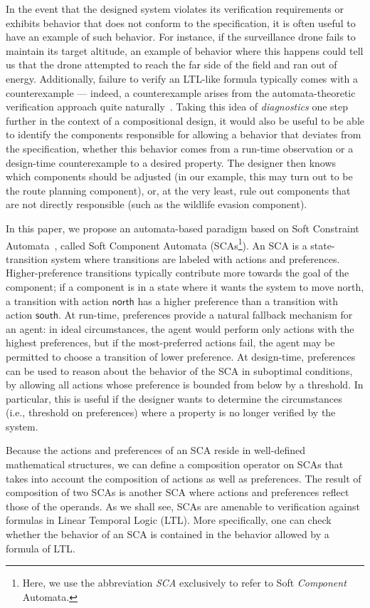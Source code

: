 \documentclass[a4paper]{article}
\theoremstyle{definition}
\newcommand{\north}{\mathsf{north}}
\newcommand{\south}{\mathsf{south}}
\begin{document}
In the event that the designed system violates its verification requirements or exhibits behavior that does not conform to the specification, it is often useful to have an example of such behavior. For instance, if the surveillance drone fails to maintain its target altitude, an example of behavior where this happens could tell us that the drone attempted to reach the far side of the field and ran out of energy. Additionally, failure to verify an LTL-like formula typically comes with a counterexample --- indeed, a counterexample arises from the automata-theoretic verification approach quite naturally~\cite{vardi-1995}. Taking this idea of \emph{diagnostics} one step further in the context of a compositional design, it would also be useful to be able to identify the components responsible for allowing a behavior that deviates from the specification, whether this behavior comes from a run-time observation or a design-time counterexample to a desired property. The designer then knows which components should be adjusted (in our example, this may turn out to be the route planning component), or, at the very least, rule out components that are not directly responsible (such as the wildlife evasion component).

In this paper, we propose an automata-based paradigm based on Soft Constraint Automata~\cite{arbab-santini-2013,kappe-arbab-talcott-2016}, called Soft Component Automata (SCAs\footnote{Here, we use the abbreviation \emph{SCA} exclusively to refer to Soft \emph{Component} Automata.}). An SCA is a state-transition system where transitions are labeled with actions and preferences. Higher-preference transitions typically contribute more towards the goal of the component; if a component is in a state where it wants the system to move north, a transition with action $\north$ has a higher preference than a transition with action $\south$. At run-time, preferences provide a natural fallback mechanism for an agent: in ideal circumstances, the agent would perform only actions with the highest preferences, but if the most-preferred actions fail, the agent may be permitted to choose a transition of lower preference. At design-time, preferences can be used to reason about the behavior of the SCA in suboptimal conditions, by allowing all actions whose preference is bounded from below by a threshold. In particular, this is useful if the designer wants to determine the circumstances (i.e., threshold on preferences) where a property is no longer verified by the system.

Because the actions and preferences of an SCA reside in well-defined mathematical structures, we can define a composition operator on SCAs that takes into account the composition of actions as well as preferences. The result of composition of two SCAs is another SCA where actions and preferences reflect those of the operands. As we shall see, SCAs are amenable to verification against formulas in Linear Temporal Logic (LTL). More specifically, one can check whether the behavior of an SCA is contained in the behavior allowed by a formula of LTL\@. 
\end{document}
